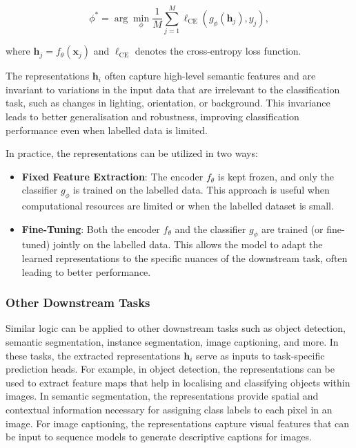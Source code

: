 \[
\phi^* = \arg \min_{\phi} \frac{1}{M} \sum_{j=1}^M \ell_{\text{CE}}(g_{\phi}(\mathbf{h}_j), y_j),
\]

where \( \mathbf{h}_j = f_{\theta}(\mathbf{x}_j) \) and \( \ell_{\text{CE}} \) denotes the cross-entropy loss function.

The representations \( \mathbf{h}_i \) often capture high-level semantic features and are invariant to variations in the input data that are irrelevant to the classification task, such as changes in lighting, orientation, or background. This invariance leads to better generalisation and robustness, improving classification performance even when labelled data is limited.

In practice, the representations can be utilized in two ways:

\begin{itemize}
    \item \textbf{Fixed Feature Extraction}: The encoder \( f_{\theta} \) is kept frozen, and only the classifier \( g_{\phi} \) is trained on the labelled data. This approach is useful when computational resources are limited or when the labelled dataset is small.
    \item \textbf{Fine-Tuning}: Both the encoder \( f_{\theta} \) and the classifier \( g_{\phi} \) are trained (or fine-tuned) jointly on the labelled data. This allows the model to adapt the learned representations to the specific nuances of the downstream task, often leading to better performance.
\end{itemize}

\subsubsection{Other Downstream Tasks}

Similar logic can be applied to other downstream tasks such as object detection, semantic segmentation, instance segmentation, image captioning, and more. In these tasks, the extracted representations \( \mathbf{h}_i \) serve as inputs to task-specific prediction heads. For example, in object detection, the representations can be used to extract feature maps that help in localising and classifying objects within images. In semantic segmentation, the representations provide spatial and contextual information necessary for assigning class labels to each pixel in an image. For image captioning, the representations capture visual features that can be input to sequence models to generate descriptive captions for images.

